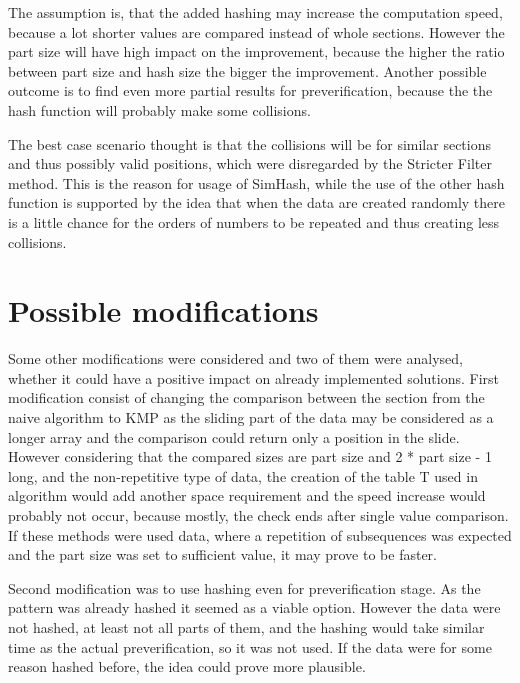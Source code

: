 The assumption is, that the added hashing may increase the computation speed, because a lot shorter values are compared instead of whole sections. However the part size will have high impact on the improvement, because the higher the ratio between part size and hash size the bigger the improvement. Another possible outcome is to find even more partial results for preverification, because the the hash function will probably make some collisions.

The best case scenario thought is that the collisions will be for similar sections and thus possibly valid positions, which were disregarded by the Stricter Filter method. This is the reason for usage of SimHash, while the use of the other hash function is supported by the idea that when the data are created randomly there is a little chance for the orders of numbers to be repeated and thus creating less collisions.


\section{Possible modifications}
Some other modifications were considered and two of them were analysed, whether it could have a positive impact on already implemented solutions. First modification consist of changing the comparison between the section from the naive algorithm to KMP as the sliding part of the data may be considered as a longer array and the comparison could return only a position in the slide. However considering that the compared sizes are part size and 2 * part size - 1 long, and the non-repetitive type of data, the creation of the table T used in algorithm would add another space requirement and the speed increase would probably not occur, because mostly, the check ends after single value comparison. If these methods were used data, where a repetition of subsequences was expected and the part size was set to sufficient value, it may prove to be faster.

Second modification was to use hashing even for preverification stage. As the pattern was already hashed it seemed as a viable option. However the data were not hashed, at least not all parts of them, and the hashing would take similar time as the actual preverification, so it was not used. If the data were for some reason hashed before, the idea could prove more plausible.
